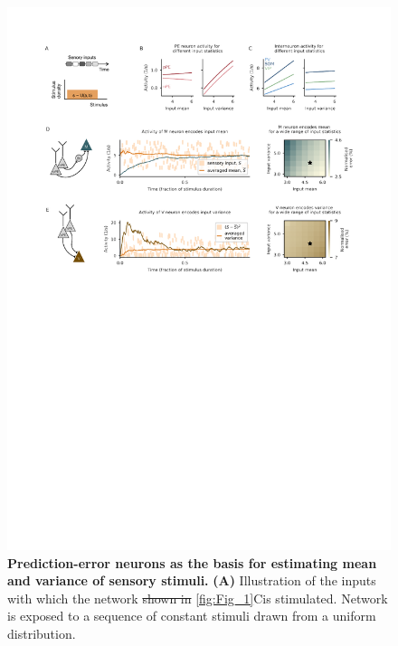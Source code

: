 \documentclass[10pt,a4paper]{article}
\providecommand{\DIFaddtex}[1]{{\protect\color{blue}\uwave{#1}}} %
\providecommand{\DIFdeltex}[1]{{\protect\color{red}\sout{#1}}}                      %
\providecommand{\DIFaddFL}[1]{\DIFadd{#1}} %
\providecommand{\DIFdelFL}[1]{\DIFdel{#1}} %
\providecommand{\DIFaddbeginFL}{} %
\providecommand{\DIFaddendFL}{} %
\providecommand{\DIFdelbeginFL}{} %
\providecommand{\DIFdelendFL}{} %
\providecommand{\DIFadd}[1]{\texorpdfstring{\DIFaddtex{#1}}{#1}} %
\providecommand{\DIFdel}[1]{\texorpdfstring{\DIFdeltex{#1}}{}} %
\newcommand{\DIFscaledelfig}{0.5}
\newlength{\DIFdelgraphicswidth} %
\newlength{\DIFdelgraphicsheight} %
\newcommand{\DIFaddincludegraphics}[2][]{{\color{blue}\fbox{\DIFOincludegraphics[#1]{#2}}}} %
\newcommand{\DIFdelincludegraphics}[2][]{%
\sbox{\DIFdelgraphicsbox}{\DIFOincludegraphics[#1]{#2}}%
\settoboxwidth{\DIFdelgraphicswidth}{\DIFdelgraphicsbox} %
\settoboxtotalheight{\DIFdelgraphicsheight}{\DIFdelgraphicsbox} %
\scalebox{\DIFscaledelfig}{%
\parbox[b]{\DIFdelgraphicswidth}{\usebox{\DIFdelgraphicsbox}\\[-\baselineskip] \rule{\DIFdelgraphicswidth}{0em}}\llap{\resizebox{\DIFdelgraphicswidth}{\DIFdelgraphicsheight}{%
\setlength{\unitlength}{\DIFdelgraphicswidth}%
\begin{picture}(1,1)%
\thicklines\linethickness{2pt} %
{\color[rgb]{1,0,0}\put(0,0){\framebox(1,1){}}}%
{\color[rgb]{1,0,0}\put(0,0){\line( 1,1){1}}}%
{\color[rgb]{1,0,0}\put(0,1){\line(1,-1){1}}}%
\end{picture}%
}\hspace*{3pt}}} %
} %
\DeclareRobustCommand{\DIFaddbeginFL}{\DIFOaddbeginFL \let\includegraphics\DIFaddincludegraphics} %
\DeclareRobustCommand{\DIFaddendFL}{\DIFOaddendFL \let\includegraphics\DIFOincludegraphics} %
\DeclareRobustCommand{\DIFdelbeginFL}{\DIFOdelbeginFL \let\includegraphics\DIFdelincludegraphics} %
\DeclareRobustCommand{\DIFdelendFL}{\DIFOaddendFL \let\includegraphics\DIFOincludegraphics} %
\begin{document}
\begin{figure}[t!]
	\centering
    \includegraphics[width=1\linewidth]{../results/figures/final/Fig_2}
\caption{\DIFdelbeginFL %
\DIFdelendFL \DIFaddbeginFL \footnotesize{\bf Prediction-error neurons as the basis for estimating mean and variance of sensory stimuli.\newline} 
\DIFaddendFL {\bf (A)} Illustration of the inputs with which the network \DIFdelbeginFL \DIFdelFL{shown in }\DIFdelendFL \DIFaddbeginFL \DIFaddFL{(Fig. }\DIFaddendFL \ref{fig:Fig_1}C\DIFaddbeginFL \DIFaddFL{) }\DIFaddendFL is stimulated. Network is exposed to a sequence of constant stimuli drawn from a uniform distribution.
}
\end{figure}
\end{document}
